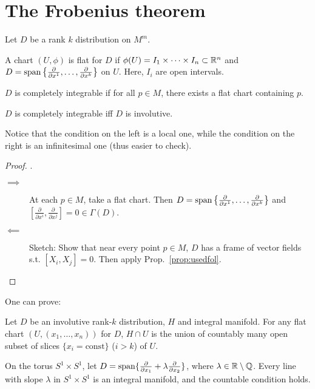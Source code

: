 \section{The Frobenius theorem}
Let $D$ be a rank $k$ distribution on $M^{m}$.
\begin{definition}
    A chart $(U, \phi)$ is flat for $D$ if $\phi(U) = I_1 \times \cdots \times I_n \subset \mathbb{R}^{n}$ and $D = \operatorname{span} \left\{\frac{\partial }{\partial x^1}, \ldots, \frac{\partial }{\partial x^k}\right\}$ on $U$.
    Here, $I_i$ are open intervals.
\end{definition}
\begin{definition}
    $D$ is completely integrable if for all $p \in M$, there exists a flat chart containing $p$.
\end{definition}
\begin{theorem}[Frobenius]
    $D$ is completely integrable iff $D$ is involutive.
\end{theorem}
Notice that the condition on the left is a local one, while the condition on the right is an infinitesimal one (thus easier to check).


\begin{proof}
    .
    \begin{description}
        \item[$\boxed{\implies}$] At each $p \in M$, take a flat chart.
            Then $D = \operatorname{span} \left\{\frac{\partial }{\partial x^{1}}, \ldots, \frac{\partial }{\partial x^k}  \right\} $ and $\left[\frac{\partial }{\partial x^i}, \frac{\partial }{\partial x^j}\right] = 0 \in \Gamma(D)$.
        \item[$\boxed{\impliedby}$]
            Sketch:  Show that near every point $p \in M$, $D$ has a frame of vector fields s.t. $[X_i, X_j] = 0$. Then apply Prop.~\ref{prop:usedfol}.
    \end{description}

\end{proof}

One can prove:
\begin{prop}\label{prop:countable}
    Let $D$ be an involutive rank-$k$ distribution, $H$ and integral manifold.
    For any flat chart $(U, (x_1, \ldots, x_n))$ for $D$, $H \cap U$ is the union of countably many open subset of slices $\{x_i = \text{const}\}$ ($i>k$) of $U$.
\end{prop}
 
\begin{eg}
    On the torus $S^{1} \times S^{1}$, let $D = \operatorname{span} \{\frac{\partial }{\partial x_{1}}  + \lambda \frac{\partial }{\partial x_2} \} $, where $\lambda \in  \mathbb{R} \setminus \mathbb{Q}$.
    Every line with slope $\lambda$ in $S^{1}\times S^{1}$ is an integral manifold, and the countable condition holds.
\end{eg}
